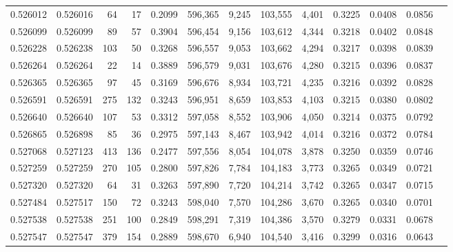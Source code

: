\begin{tabular}{rrrrrrrrrrrrr}
0.526012 & 0.526016 &    64 &    17 &                                     0.2099 & 596,365 &   9,245 & 103,555 &   4,401 & 0.3225 & 0.0408 & 0.0856 \\
0.526099 & 0.526099 &    89 &    57 &                                     0.3904 & 596,454 &   9,156 & 103,612 &   4,344 & 0.3218 & 0.0402 & 0.0848 \\
0.526228 & 0.526238 &   103 &    50 &                                     0.3268 & 596,557 &   9,053 & 103,662 &   4,294 & 0.3217 & 0.0398 & 0.0839 \\
0.526264 & 0.526264 &    22 &    14 &                                     0.3889 & 596,579 &   9,031 & 103,676 &   4,280 & 0.3215 & 0.0396 & 0.0837 \\
0.526365 & 0.526365 &    97 &    45 &                                     0.3169 & 596,676 &   8,934 & 103,721 &   4,235 & 0.3216 & 0.0392 & 0.0828 \\
0.526591 & 0.526591 &   275 &   132 &                                     0.3243 & 596,951 &   8,659 & 103,853 &   4,103 & 0.3215 & 0.0380 & 0.0802 \\
0.526640 & 0.526640 &   107 &    53 &                                     0.3312 & 597,058 &   8,552 & 103,906 &   4,050 & 0.3214 & 0.0375 & 0.0792 \\
0.526865 & 0.526898 &    85 &    36 &                                     0.2975 & 597,143 &   8,467 & 103,942 &   4,014 & 0.3216 & 0.0372 & 0.0784 \\
0.527068 & 0.527123 &   413 &   136 &                                     0.2477 & 597,556 &   8,054 & 104,078 &   3,878 & 0.3250 & 0.0359 & 0.0746 \\
0.527259 & 0.527259 &   270 &   105 &                                     0.2800 & 597,826 &   7,784 & 104,183 &   3,773 & 0.3265 & 0.0349 & 0.0721 \\
0.527320 & 0.527320 &    64 &    31 &                                     0.3263 & 597,890 &   7,720 & 104,214 &   3,742 & 0.3265 & 0.0347 & 0.0715 \\
0.527484 & 0.527517 &   150 &    72 &                                     0.3243 & 598,040 &   7,570 & 104,286 &   3,670 & 0.3265 & 0.0340 & 0.0701 \\
0.527538 & 0.527538 &   251 &   100 &                                     0.2849 & 598,291 &   7,319 & 104,386 &   3,570 & 0.3279 & 0.0331 & 0.0678 \\
0.527547 & 0.527547 &   379 &   154 &                                     0.2889 & 598,670 &   6,940 & 104,540 &   3,416 & 0.3299 & 0.0316 & 0.0643 \\

\end{tabular}
